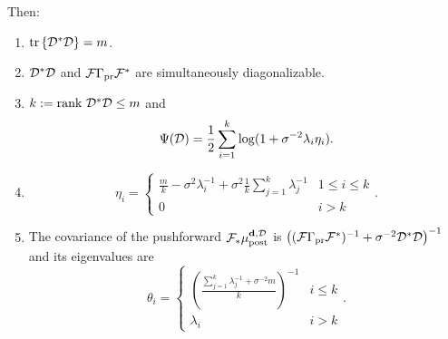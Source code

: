 \begin{theorem}
  Then:
  \begin{enumerate}
  \item  \(\textup{tr}\left \{\mathcal{D}^*\mathcal{D} \right \} = m\).
  \item \(\mathcal{D}^*\mathcal{D}\) and \(\mathcal{F}\Gamma_{\textup{pr}}\mathcal{F}^*\) are simultaneously
    diagonalizable.
  \item \(k := \textup{rank}\  \mathcal{D}^*\mathcal{D} \leq m\) and
    \begin{equation*}
      \tar(\opt) = \frac12 \sum_{i=1}^{k} \log (1 + \sigma^{-2}\lambda_i\eta_i). %
    \end{equation*}
  \item
    \begin{equation*}
        \eta_i = \begin{cases}
          \frac{m}{k} - \sigma^2 \lambda_i^{-1} + \sigma^2 \frac{1}{k} \sum_{j=1}^k \lambda_j^{-1} & 1 \leq i \leq k \\
          0 & i > k 
        \end{cases}.
    \end{equation*}
  \item The covariance of the pushforward \(\mathcal{F}_{*} \mu_{\textup{post}}^{\mathbf{d}, \mathcal{D}}\) is \(\left
    ( (\mathcal{F} \Gamma_{\textup{pr}} \mathcal{F}^*)^{-1} + \sigma^{-2} \mathcal{D}^*\mathcal{D} \right
    )^{-1}\) and its eigenvalues are
    \begin{equation}\label{eq:cylinders}
      \theta_i =
      \begin{cases}
        \left(\frac{\sum_{j=1}^k \lambda_j^{-1} + \sigma^{-2}m}{k} \right )^{-1} & i \leq k \\
        \lambda_i &  i > k 
      \end{cases}.
    \end{equation}
  \end{enumerate}


\end{theorem}
